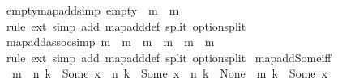 \begin{isabellebody}
\isanewline
{}\isamarkupfalse%
\ empty{\isacharunderscore}{\kern0pt}map{\isacharunderscore}{\kern0pt}add{\isacharbrackleft}{\kern0pt}simp{\isacharbrackright}{\kern0pt}{\isacharcolon}{\kern0pt}\ {\isachardoublequoteopen}empty\ {\isacharplus}{\kern0pt}{\isacharplus}{\kern0pt}\ m\ {\isacharequal}{\kern0pt}\ m{\isachardoublequoteclose}\isanewline
%
\isadelimproof
%
\endisadelimproof
%
\isatagproof
{}\isamarkupfalse%
\ {\isacharparenleft}{\kern0pt}rule\ ext{\isacharparenright}{\kern0pt}\ {\isacharparenleft}{\kern0pt}simp\ add{\isacharcolon}{\kern0pt}\ map{\isacharunderscore}{\kern0pt}add{\isacharunderscore}{\kern0pt}def\ split{\isacharcolon}{\kern0pt}\ option{\isachardot}{\kern0pt}split{\isacharparenright}{\kern0pt}%
\endisatagproof
{\isafoldproof}%
%
\isadelimproof
\isanewline
%
\endisadelimproof
\isanewline
{}\isamarkupfalse%
\ map{\isacharunderscore}{\kern0pt}add{\isacharunderscore}{\kern0pt}assoc{\isacharbrackleft}{\kern0pt}simp{\isacharbrackright}{\kern0pt}{\isacharcolon}{\kern0pt}\ {\isachardoublequoteopen}m{}\ {\isacharplus}{\kern0pt}{\isacharplus}{\kern0pt}\ {\isacharparenleft}{\kern0pt}m{}\ {\isacharplus}{\kern0pt}{\isacharplus}{\kern0pt}\ m{}{\isacharparenright}{\kern0pt}\ {\isacharequal}{\kern0pt}\ {\isacharparenleft}{\kern0pt}m{}\ {\isacharplus}{\kern0pt}{\isacharplus}{\kern0pt}\ m{}{\isacharparenright}{\kern0pt}\ {\isacharplus}{\kern0pt}{\isacharplus}{\kern0pt}\ m{}{\isachardoublequoteclose}\isanewline
%
\isadelimproof
%
\endisadelimproof
%
\isatagproof
{}\isamarkupfalse%
\ {\isacharparenleft}{\kern0pt}rule\ ext{\isacharparenright}{\kern0pt}\ {\isacharparenleft}{\kern0pt}simp\ add{\isacharcolon}{\kern0pt}\ map{\isacharunderscore}{\kern0pt}add{\isacharunderscore}{\kern0pt}def\ split{\isacharcolon}{\kern0pt}\ option{\isachardot}{\kern0pt}split{\isacharparenright}{\kern0pt}%
\endisatagproof
{\isafoldproof}%
%
\isadelimproof
\isanewline
%
\endisadelimproof
\isanewline
{}\isamarkupfalse%
\ map{\isacharunderscore}{\kern0pt}add{\isacharunderscore}{\kern0pt}Some{\isacharunderscore}{\kern0pt}iff{\isacharcolon}{\kern0pt}\isanewline
\ \ {\isachardoublequoteopen}{\isacharparenleft}{\kern0pt}{\isacharparenleft}{\kern0pt}m\ {\isacharplus}{\kern0pt}{\isacharplus}{\kern0pt}\ n{\isacharparenright}{\kern0pt}\ k\ {\isacharequal}{\kern0pt}\ Some\ x{\isacharparenright}{\kern0pt}\ {\isacharequal}{\kern0pt}\ {\isacharparenleft}{\kern0pt}n\ k\ {\isacharequal}{\kern0pt}\ Some\ x\ {\isasymor}\ n\ k\ {\isacharequal}{\kern0pt}\ None\ {\isasymand}\ m\ k\ {\isacharequal}{\kern0pt}\ Some\ x{\isacharparenright}{\kern0pt}{\isachardoublequoteclose}\isanewline

\end{isabellebody}
